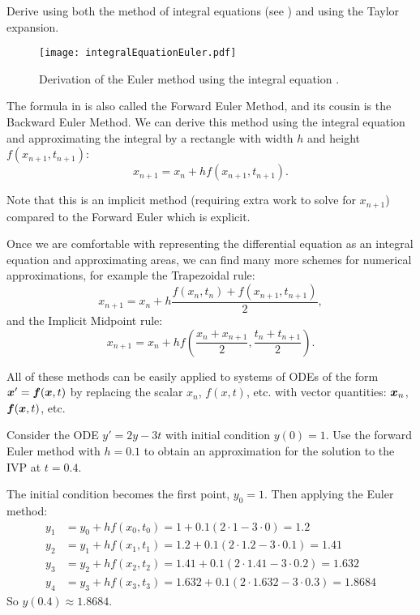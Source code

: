 \begin{exercise}
	Derive  using both the method of integral equations (see ) and using the Taylor expansion.
\end{exercise}

\begin{figure}[!ht]
	\centering
	\texttt{[image: integralEquationEuler.pdf]}
	\caption{Derivation of the Euler method using the integral equation \cite[Figure 8.1.1]{boyce}.}
	\label{fig:eulerint}
\end{figure}

The formula in  is also called the Forward Euler Method, and its cousin is the Backward Euler Method. We can derive this method using the integral equation and approximating the integral by a rectangle with width $h$ and height $f(x_{n+1}, t_{n+1})$:
\begin{equation}
	x_{n+1} = x_n + h f(x_{n+1}, t_{n+1}).
\end{equation}

Note that this is an implicit method (requiring extra work to solve for $x_{n+1}$) compared to the Forward Euler which is explicit.

Once we are comfortable with representing the differential equation as an integral equation and approximating areas, we can find many more schemes for numerical approximations, for example the Trapezoidal rule:
\begin{equation}
	x_{n+1} = x_n + h \frac{f(x_n, t_n)+f(x_{n+1}, t_{n+1})}{2},
\end{equation}
and the Implicit Midpoint rule:
\begin{equation}
	x_{n+1} = x_n + h f\left(\frac{x_n+x_{n+1}}{2}, \frac{t_n+t_{n+1}}{2}\right).
\end{equation}

\begin{remark}
	All of these methods can be easily applied to systems of ODEs of the form $\bm{x}' = \bm{f}(\bm{x}, t)$ by replacing the scalar $x_n$, $f(x,t)$, etc. with vector quantities: $\bm{x}_n$, $\bm{f}(\bm{x}, t)$, etc.
\end{remark}

\begin{eg}
	Consider the ODE $y' = 2y - 3t$ with initial condition $y(0)=1$. Use the forward Euler method with $h=0.1$ to obtain an approximation for the solution to the IVP at $t=0.4$.
	
	The initial condition becomes the first point, $y_0 = 1$. Then applying the Euler method:
	\begin{align*}
		y_1 &= y_0 + hf(x_0, t_0) = 1 + 0.1 (2\cdot 1 - 3\cdot 0) = 1.2 \\
		y_2 &= y_1 + hf(x_1, t_1) = 1.2 + 0.1 (2\cdot 1.2 - 3\cdot 0.1) = 1.41 \\
		y_3 &= y_2 + hf(x_2, t_2) = 1.41 + 0.1 (2\cdot 1.41 - 3\cdot 0.2) = 1.632 \\
		y_4 &= y_3 + hf(x_3, t_3) = 1.632 + 0.1 (2\cdot 1.632 - 3\cdot 0.3) = 1.8684
	\end{align*}
	So $y(0.4) \approx 1.8684$.
\end{eg}


